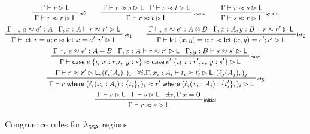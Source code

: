 \documentclass[acmsmall,screen,review]{acmart}
\newcommand{\mb}[1]{\ensuremath{\mathbf{#1}}}
\newcommand{\ms}[1]{\ensuremath{\mathsf{#1}}}
\newcommand{\lto}{:}
\newcommand{\linl}[1]{\iota_l\;{#1}}
\newcommand{\linr}[1]{\iota_r\;{#1}}
\newcommand{\caseexpr}[5]{\ms{case}\;#1\;\{\linl{#2} \lto #3, \linr{#4} \lto #5\}}
\newcommand{\letstmt}[3]{\ensuremath{\ms{let}\;#1 = #2; #3}}
\newcommand{\where}[2]{#1\;\ms{where}\;#2}
\newcommand{\wbranch}[3]{#1(#2) \lto \{#3\}}
\newcommand{\bhyp}[2]{#1 : #2}
\newcommand{\lhyp}[2]{#1(#2)}
\newcommand{\rle}[1]{{\scriptsize\textsf{#1}}}
\newcommand{\haslb}[3]{#1 \vdash #2 \rhd #3}
\newcommand{\teqv}{\approx}
\newcommand{\tmeq}[5]{#1 \vdash_{#2} #3 \teqv #4 : {#5}}
\newcommand{\lbeq}[4]{#1 \vdash #2 \teqv #3 \rhd {#4}}
\newcommand{\isotopessa}{\(\lambda_{\ms{SSA}}\)}
\begin{document}
\begin{figure}
  \begin{gather*}
    \prftree[r]{\rle{refl}}{\haslb{\Gamma}{r}{\ms{L}}}{\lbeq{\Gamma}{r}{r}{\ms{L}}} \qquad
    \prftree[r]{\rle{trans}}{\lbeq{\Gamma}{r}{s}{\ms{L}}}{\lbeq{\Gamma}{s}{t}{\ms{L}}}
      {\lbeq{\Gamma}{r}{t}{\ms{L}}} \qquad
    \prftree[r]{\rle{symm}}{\lbeq{\Gamma}{r}{s}{\ms{L}}}{\lbeq{\Gamma}{s}{r}{\ms{L}}}
    \\
    \prftree[r]{\rle{let}$_1$}
      {\tmeq{\Gamma}{\epsilon}{a}{a'}{A}}
      {\lbeq{\Gamma, \bhyp{x}{A}}{r}{r'}{\ms{L}}}
      {\lbeq{\Gamma}{\letstmt{x}{a}{r}}{\letstmt{x}{a'}{r'}}{\ms{L}}}
    \qquad
    \prftree[r]{\rle{let}$_2$}
      {\tmeq{\Gamma}{\epsilon}{e}{e'}{A \otimes B}}
      {\lbeq{\Gamma, \bhyp{x}{A}, \bhyp{y}{B}}{r}{r'}{\ms{L}}}
      {\lbeq{\Gamma}{\letstmt{(x, y)}{e}{r}}{\letstmt{(x, y)}{e'}{r'}}{\ms{L}}}
    \\
    \prftree[r]{\rle{case}}
      {\tmeq{\Gamma}{\epsilon}{e}{e'}{A + B}}
      {\lbeq{\Gamma, \bhyp{x}{A}}{r}{r'}{\ms{L}}}
      {\lbeq{\Gamma, \bhyp{y}{B}}{s}{s'}{\ms{L}}}
      {\lbeq{\Gamma}{\caseexpr{e}{x}{r}{y}{s}}{\caseexpr{e'}{x}{r'}{y}{s'}}{\ms{L}}}
    \\
    \prftree[r]{\rle{cfg}}
      {\lbeq{\Gamma}{r}{r'}{\ms{L}, (\lhyp{\ell_i}{A_i},)_i}}
      {\forall i. \lbeq{\Gamma, \bhyp{x_i}{A_i}}{t_i}{t_i'}{\ms{L}, (\lhyp{\ell_j}{A_j},)_j}}
      {\lbeq{\Gamma}
        {\where{r}{(\wbranch{\ell_i}{x_i: A_i}{t_i},)_i}}
        {\where{r'}{(\wbranch{\ell_i}{x_i: A_i}{t_i'},)_i}}
        {\ms{L}}
      }
    \\
    \prftree[r]{\rle{initial}}
      {\haslb{\Gamma}{r}{\ms{L}}}
      {\haslb{\Gamma}{s}{\ms{L}}}
      {\exists x, \Gamma\;x = \mb{0}}
      {\lbeq{\Gamma}{r}{s}{\ms{L}}}
  \end{gather*}
  \Description{}
  \caption{Congruence rules for \isotopessa{} regions}
  \label{fig:ssa-reg-congr-rules}
\end{figure}
\end{document}
